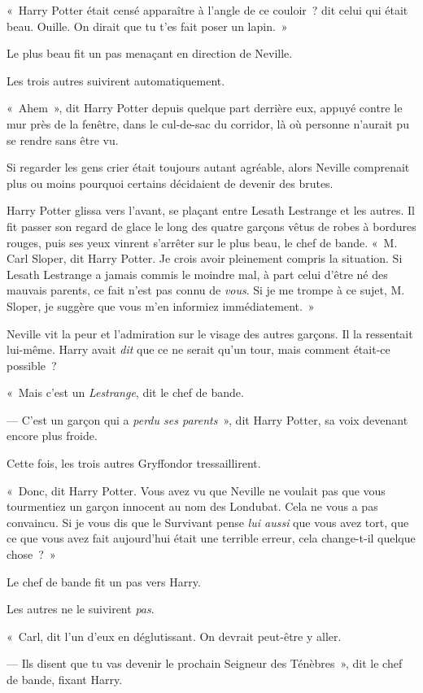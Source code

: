 «~Harry Potter était censé apparaître à l'angle de ce couloir~? dit celui qui était beau.
Ouille. On dirait que tu t'es fait poser un lapin.~»

Le plus beau fit un pas menaçant en direction de Neville.

Les trois autres suivirent automatiquement.

«~Ahem~», dit Harry Potter depuis quelque part derrière eux, appuyé contre le mur près de la fenêtre, dans le cul-de-sac du corridor, là où personne n'aurait pu se rendre sans être vu.

Si regarder les gens crier était toujours autant agréable, alors Neville comprenait plus ou moins pourquoi certains décidaient de devenir des brutes.

Harry Potter glissa vers l'avant, se plaçant entre Lesath Lestrange et les autres.
Il fit passer son regard de glace le long des quatre garçons vêtus de robes à bordures rouges, puis ses yeux vinrent s'arrêter sur le plus beau, le chef de bande.
«~M. Carl Sloper, dit Harry Potter.
Je crois avoir pleinement compris la situation.
Si Lesath Lestrange a jamais commis le moindre mal, à part celui d'être né des mauvais parents, ce fait n'est pas connu de \emph{vous}.
Si je me trompe à ce sujet, M. Sloper, je suggère que vous m'en informiez immédiatement.~»

Neville vit la peur et l'admiration sur le visage des autres garçons.
Il la ressentait lui-même.
Harry avait \emph{dit} que ce ne serait qu'un tour, mais comment était-ce possible~?

«~Mais c'est un \emph{Lestrange}, dit le chef de bande.

--- C'est un garçon qui a \emph{perdu ses parents}~», dit Harry Potter, sa voix devenant encore plus froide.

Cette fois, les trois autres Gryffondor tressaillirent.

«~Donc, dit Harry Potter.
Vous avez vu que Neville ne voulait pas que vous tourmentiez un garçon innocent au nom des Londubat.
Cela ne vous a pas convaincu.
Si je vous dis que le Survivant pense \emph{lui aussi} que vous avez tort, que ce que vous avez fait aujourd'hui était une terrible erreur, cela change-t-il quelque chose~?~»

Le chef de bande fit un pas vers Harry.

Les autres ne le suivirent \emph{pas}.

«~Carl, dit l'un d'eux en déglutissant.
On devrait peut-être y aller.

--- Ils disent que tu vas devenir le prochain Seigneur des Ténèbres~», dit le chef de bande, fixant Harry.

